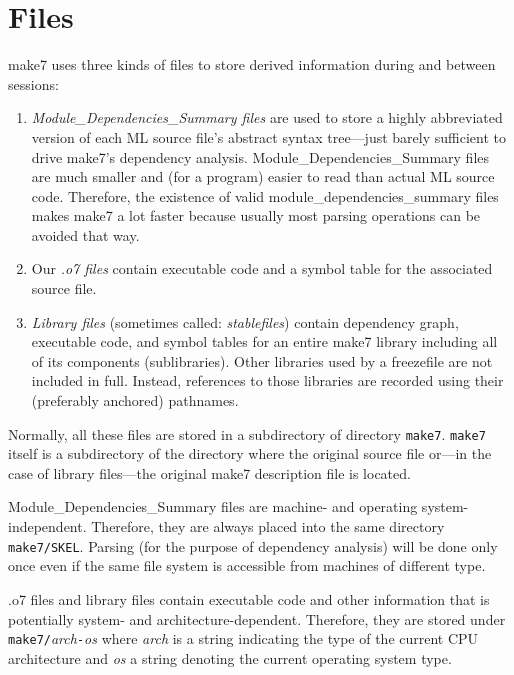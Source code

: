 
\section{Files}
\label{sec:files}

make7 uses three kinds of files to store derived information during and
between sessions:

\begin{enumerate}
\item {\it Module_Dependencies_Summary files} are used to store a highly abbreviated
version of each ML source file's abstract syntax tree---just barely
sufficient to drive make7's dependency analysis.  Module_Dependencies_Summary files are much
smaller and (for a program) easier to read than actual ML source code.
Therefore, the existence of valid module_dependencies_summary files makes make7 a lot faster
because usually most parsing operations can be avoided that way.
\item Our {\it .o7 files} 
contain executable code and a symbol table for the associated
source file.
\item {\it Library files} (sometimes called: {\em stablefiles}) contain
dependency graph, executable code, and symbol tables for an entire make7
library including all of its components (sublibraries).  Other libraries
used by a freezefile are not included in full.  Instead,
references to those libraries are recorded using their (preferably
anchored) pathnames.
\end{enumerate}

Normally, all these files are stored in a subdirectory of directory
{\tt make7}. {\tt make7} itself is a subdirectory of the directory where the
original source file or---in the case of library files---the
original make7 description file is located.

Module_Dependencies_Summary files are machine- and operating system-independent.
Therefore, they are always placed into the same directory {\tt
make7/SKEL}. Parsing (for the purpose of dependency analysis) will be
done only once even if the same file system is accessible from
machines of different type.

.o7 files and library files contain executable code and other
information that is potentially system- and architecture-dependent.
Therefore, they are stored under {\tt make7/}{\it arch}{\tt -}{\it os}
where {\it arch} is a string indicating the type of the current
CPU architecture and {\it os} a string denoting the current operating
system type.


